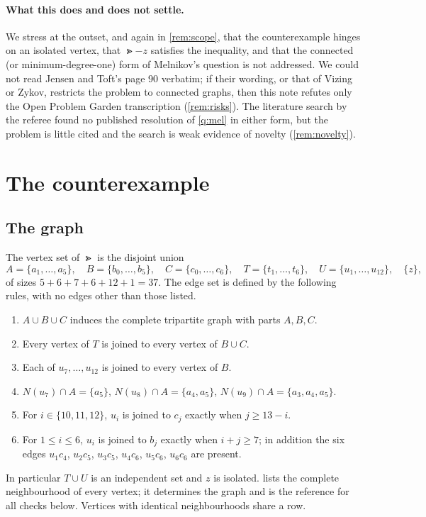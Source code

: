 \documentclass[11pt,a4paper]{article}
\theoremstyle{plain}
\theoremstyle{definition}
\theoremstyle{remark}
\providecommand{\tightlist}{\setlength{\itemsep}{0pt}\setlength{\parskip}{0pt}}
\begin{document}
\paragraph{What this does and does not settle.} We stress at the outset, and again in \cref{rem:scope}, that the counterexample hinges on an isolated vertex, that $\Gt-z$ satisfies the inequality, and that the connected (or minimum-degree-one) form of Melnikov's question is not addressed. We could not read Jensen and Toft's page 90 verbatim; if their wording, or that of Vizing or Zykov, restricts the problem to connected graphs, then this note refutes only the Open Problem Garden transcription (\cref{rem:risks}). The literature search by the referee found no published resolution of \cref{q:mel} in either form, but the problem is little cited and the search is weak evidence of novelty (\cref{rem:novelty}).

\section{The counterexample}\label{sec:counterexample}

\subsection{The graph}

The vertex set of $\Gt$ is the disjoint union
\[
A=\{a_1,\dots,a_5\},\quad B=\{b_0,\dots,b_5\},\quad C=\{c_0,\dots,c_6\},\quad T=\{t_1,\dots,t_6\},\quad U=\{u_1,\dots,u_{12}\},\quad \{z\},
\]
of sizes $5+6+7+6+12+1=37$. The edge set is defined by the following rules, with no edges other than those listed.
\begin{enumerate}[label=(E\arabic*),leftmargin=3em]\tightlist
\item\label{E1} $A\cup B\cup C$ induces the complete tripartite graph with parts $A,B,C$.
\item\label{E2} Every vertex of $T$ is joined to every vertex of $B\cup C$.
\item\label{E3} Each of $u_7,\dots,u_{12}$ is joined to every vertex of $B$.
\item\label{E4} $N(u_7)\cap A=\{a_5\}$, $N(u_8)\cap A=\{a_4,a_5\}$, $N(u_9)\cap A=\{a_3,a_4,a_5\}$.
\item\label{E5} For $i\in\{10,11,12\}$, $u_i$ is joined to $c_j$ exactly when $j\ge 13-i$.
\item\label{E6} For $1\le i\le6$, $u_i$ is joined to $b_j$ exactly when $i+j\ge7$; in addition the six edges $u_1c_4$, $u_2c_5$, $u_3c_5$, $u_4c_6$, $u_5c_6$, $u_6c_6$ are present.
\end{enumerate}
In particular $T\cup U$ is an independent set and $z$ is isolated.  lists the complete neighbourhood of every vertex; it determines the graph and is the reference for all checks below. Vertices with identical neighbourhoods share a row.
\end{document}
